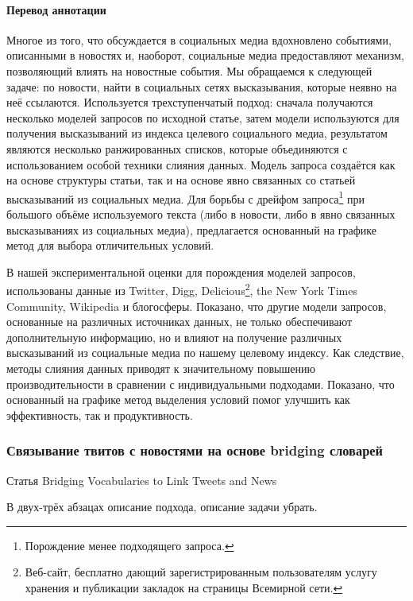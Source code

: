         \paragraph{Перевод аннотации}
            Многое из того, что обсуждается в социальных медиа вдохновлено событиями, описанными в новостях и, наоборот, социальные медиа предоставляют механизм, позволяющий влиять на новостные события.
            Мы обращаемся к следующей задаче: по новости, найти в социальных сетях высказывания, которые неявно на неё ссылаются.
            Используется трехступенчатый подход: сначала получаются несколько моделей запросов по исходной статье, затем модели используются для получения высказываний из индекса целевого социального медиа, результатом являются несколько ранжированных списков, которые объединяются с использованием особой техники слияния данных.
            Модель запроса создаётся как на основе структуры статьи, так и на основе явно связанных со статьей высказываний из социальных медиа.
            Для борьбы с дрейфом запроса\footnote{Порождение менее подходящего запроса.} при большого объёме используемого текста (либо в новости, либо в явно связанных высказываниях из социальных медиа), предлагается основанный на графике метод для выбора отличительных условий.

            В нашей экспериментальной оценки для порождения моделей запросов, использованы данные из Twitter, Digg, Delicious\footnote{Веб-сайт, бесплатно дающий зарегистрированным пользователям услугу хранения и публикации закладок на страницы Всемирной сети.}, the New York Times Community, Wikipedia и блогосферы.
            Показано, что другие модели запросов, основанные на различных источниках данных, не только обеспечивают дополнительную информацию, но и влияют на получение различных высказываний из социальные медиа по нашему целевому индексу.
            Как следствие, методы слияния данных приводят к значительному повышению производительности в сравнении с индивидуальными подходами.
            Показано, что основанный на графике метод выделения условий помог улучшить как эффективность, так и продуктивность.

    \subsubsection{Связывание твитов с новостями на основе bridging словарей}
        Статья Bridging Vocabularies to Link Tweets and News

        В двух-трёх абзацах описание подхода, описание задачи убрать.

